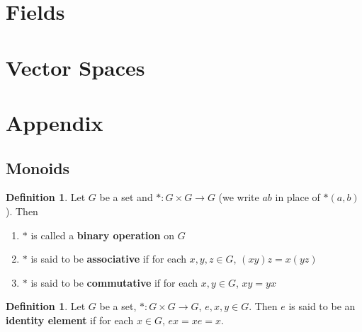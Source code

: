 \documentclass[12pt]{amsart}
\theoremstyle{definition}
\newtheorem{defn}[definition]{Definition}
\begin{document}
	
	
	
	
	
	
	
	
	
	\newpage
	\section{Fields}
	
	
	
	
	
	
	
	
	
	
	
	
	
	
	
	
	
	
	
	
	
	
	
	
	
	
	
	
	\newpage
	\section{Vector Spaces}
	
	\section{Appendix}
	\subsection{Monoids}
	
	\begin{defn}
	Let $G$ be a set and $*: G \times G \rightarrow G$ (we write $ab$ in place of $*(a,b)$). Then 
	\begin{enumerate}
	\item $*$ is called a \textbf{binary operation} on $G$	
	\item $*$ is said to be \textbf{associative}	if for each $x,y,z \in G$, $(xy)z = x(yz)$
	\item $*$ is said to be \textbf{commutative} if for each $x,y \in G$, $xy = yx$ 
	\end{enumerate}
	\end{defn}
	
	\begin{defn}
	Let $G$ be a set, $*: G \times G \rightarrow G$, $e,x,y \in G$. Then $e$ is said to be an \textbf{identity element} if for each $x \in G$, $ex = xe = x$.
	\end{defn}
	
\end{document}
